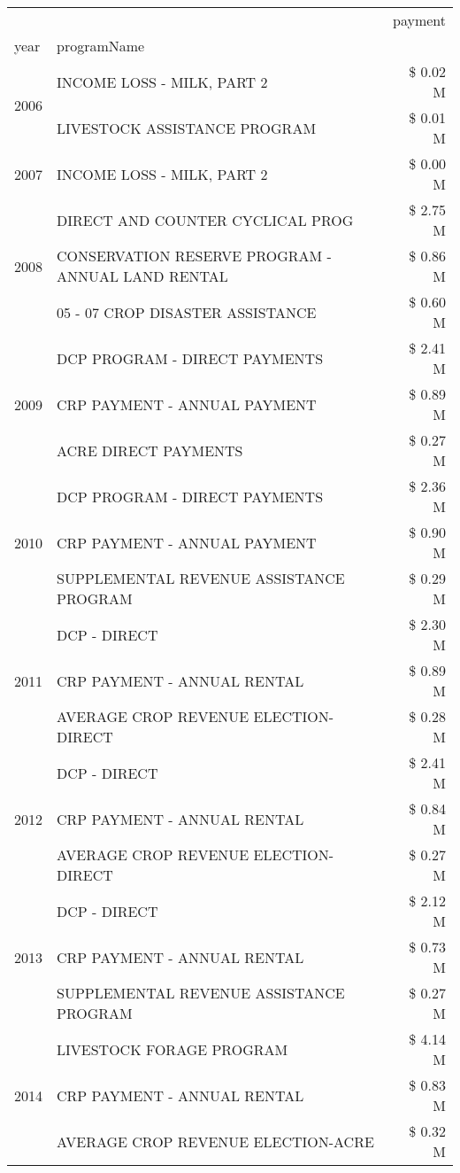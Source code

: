 \begin{tabular}{llr}
\toprule
 &  & payment \\
year & programName &  \\
\midrule
\multirow[t]{2}{*}{2006} & INCOME LOSS - MILK, PART 2 & \$ 0.02 M \\
 & LIVESTOCK ASSISTANCE PROGRAM & \$ 0.01 M \\
\cline{1-3}
2007 & INCOME LOSS - MILK, PART 2 & \$ 0.00 M \\
\cline{1-3}
\multirow[t]{3}{*}{2008} & DIRECT AND COUNTER CYCLICAL PROG & \$ 2.75 M \\
 & CONSERVATION RESERVE PROGRAM - ANNUAL LAND RENTAL & \$ 0.86 M \\
 & 05 - 07 CROP DISASTER ASSISTANCE & \$ 0.60 M \\
\cline{1-3}
\multirow[t]{3}{*}{2009} & DCP PROGRAM - DIRECT PAYMENTS & \$ 2.41 M \\
 & CRP PAYMENT - ANNUAL PAYMENT & \$ 0.89 M \\
 & ACRE DIRECT PAYMENTS & \$ 0.27 M \\
\cline{1-3}
\multirow[t]{3}{*}{2010} & DCP PROGRAM - DIRECT PAYMENTS & \$ 2.36 M \\
 & CRP PAYMENT - ANNUAL PAYMENT & \$ 0.90 M \\
 & SUPPLEMENTAL REVENUE ASSISTANCE PROGRAM & \$ 0.29 M \\
\cline{1-3}
\multirow[t]{3}{*}{2011} & DCP - DIRECT & \$ 2.30 M \\
 & CRP PAYMENT - ANNUAL RENTAL & \$ 0.89 M \\
 & AVERAGE CROP REVENUE ELECTION-DIRECT & \$ 0.28 M \\
\cline{1-3}
\multirow[t]{3}{*}{2012} & DCP - DIRECT & \$ 2.41 M \\
 & CRP PAYMENT - ANNUAL RENTAL & \$ 0.84 M \\
 & AVERAGE CROP REVENUE ELECTION-DIRECT & \$ 0.27 M \\
\cline{1-3}
\multirow[t]{3}{*}{2013} & DCP - DIRECT & \$ 2.12 M \\
 & CRP PAYMENT - ANNUAL RENTAL & \$ 0.73 M \\
 & SUPPLEMENTAL REVENUE ASSISTANCE PROGRAM & \$ 0.27 M \\
\cline{1-3}
\multirow[t]{3}{*}{2014} & LIVESTOCK FORAGE PROGRAM & \$ 4.14 M \\
 & CRP PAYMENT - ANNUAL RENTAL & \$ 0.83 M \\
 & AVERAGE CROP REVENUE ELECTION-ACRE & \$ 0.32 M \\
\cline{1-3}

\end{tabular}
